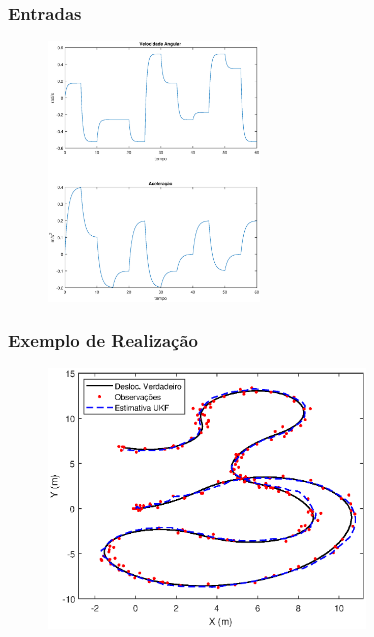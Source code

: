 \documentclass{beamer}
\begin{document}
\begin{frame}
\frametitle{Entradas}

	\begin{figure}
		\centering
		\includegraphics[width=0.5\textwidth]{images/entradas.eps}
	\end{figure}

\end{frame}

\begin{frame}
\frametitle{Exemplo de Realização}

\begin{figure}
	\centering
	\includegraphics[width=0.75\textwidth]{images/exemplo_03_30db_desloc.eps}
\end{figure}

\end{frame}


\end{document}
